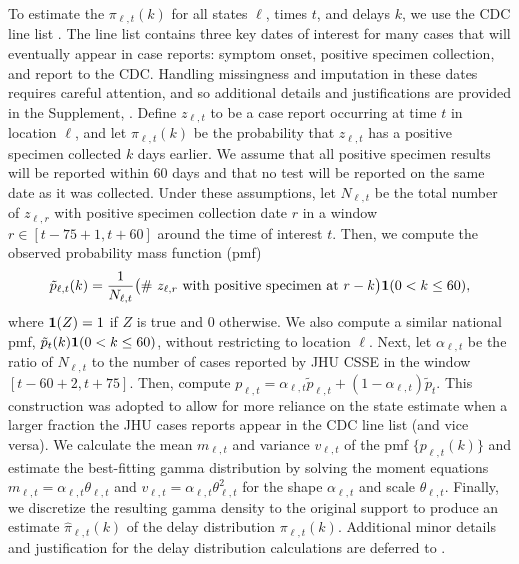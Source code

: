 To estimate the $\pi_{\ell,t}(k)$ for all states $\ell$, times $t$, and delays
$k$, we use the CDC line list \citep{cdc2020casepub,
cdc2020caserestr}. The line list contains three key dates of interest for many
cases that will eventually appear in case reports: symptom onset,
positive specimen collection, and report to the CDC. Handling missingness and
imputation in these dates requires careful attention, and so additional details and
justifications are provided in the Supplement, .
Define $z_{\ell,t}$ to be a case report occurring at time $t$ in
location $\ell$, and let $\pi_{\ell,t}(k)$ be the probability that
$z_{\ell,t}$ has a positive specimen collected $k$ days earlier. We assume that
all positive specimen results will be reported within 60 days and that no test will be
reported on the same date as it was collected.
Under these assumptions, let $N_{\ell,t}$ be the total number of
$z_{\ell,r}$ with positive specimen collection date $r$ in a window $r \in
[t-75+1, t+60]$ around the time of interest $t$. 
Then, we compute the observed probability mass function (pmf)
\begin{align}
  \label{eq:line-list-delay}
    \tilde{p}_{\ell,t}(k) = \frac{1}{N_{\ell,t}} \big(\textrm{\# $z_{\ell,r}$ with positive specimen at $r-k$}\big)\mathbf{1}(0<k\leq 60),
\end{align}
where $\mathbf{1}(Z) = 1$ if $Z$ is true and 0 otherwise. We also compute a
similar national pmf, $\tilde{p}_{t}(k)\mathbf{1}(0<k\leq 60)$, without
restricting to location $\ell$. Next, let $\alpha_{\ell,t}$ be the ratio of
$N_{\ell,t}$ to the number of cases reported by JHU
CSSE\cite{dong2020interactive} in the window $[t-60+2, t+75]$. Then, compute
$p_{\ell,t} = \alpha_{\ell,t}\tilde{p}_{\ell,t} +
(1-\alpha_{\ell,t})\tilde{p}_t$. This construction was adopted to allow for more
reliance on the state estimate when a larger fraction the JHU cases reports
appear in the CDC line list (and vice versa). We calculate the mean $m_{\ell,t}$
and variance $v_{\ell,t}$ of the pmf $\{p_{\ell,t}(k)\}$ and estimate the
best-fitting gamma distribution by solving the moment equations $m_{\ell,t} =
\alpha_{\ell,t}\theta_{\ell,t}$ and $v_{\ell,t}=
\alpha_{\ell,t}\theta_{\ell,t}^2$ for the shape $\alpha_{\ell,t}$ and scale
$\theta_{\ell,t}$. Finally, we discretize the resulting gamma density to the
original support to produce an estimate $\widehat{\pi}_{\ell,t}(k)$ of the delay
distribution $\pi_{\ell,t}(k)$. Additional minor details and justification for
the delay distribution calculations are deferred to
.
 
